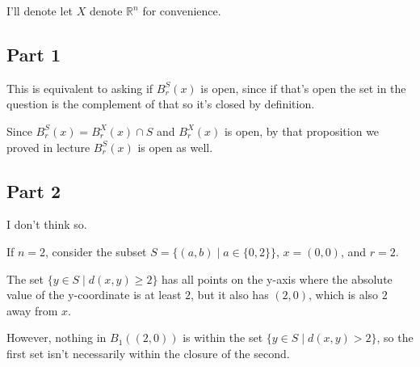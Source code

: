 \documentclass[12pt]{article}
\newcommand{\R}{\mathbb{R}}
\begin{document}
I'll denote let $X$ denote $\R^n$ for convenience.

\subsection{Part 1}

This is equivalent to asking if $B^S_r(x)$ is open,
since if that's open the set in the question is the complement of that
so it's closed by definition.

Since $B^S_r(x)=B^X_r(x) \cap S$ and $B^X_r(x)$ is open,
by that proposition we proved in lecture $B^S_r(x)$ is open as well.

\subsection{Part 2}

I don't think so.

If $n=2$, consider the subset $S=\{(a, b) \mid a \in \{0, 2\}\}$, $x=(0, 0)$, and $r=2$.

The set $\{y \in S \mid d(x, y) \ge 2\}$ has all points
on the y-axis where the absolute value of the y-coordinate is at least $2$,
but it also has $(2, 0)$, which is also $2$ away from $x$.

However, nothing in $B_1((2, 0))$ is within the set $\{y \in S \mid d(x, y) > 2\}$,
so the first set isn't necessarily within the closure of the second.
\end{document}
